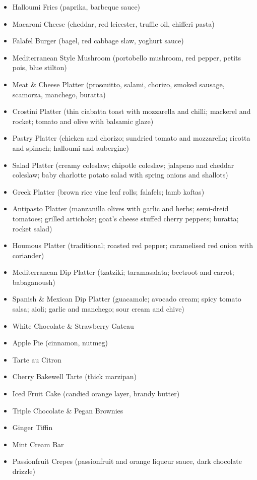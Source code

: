 \documentclass[11pt, english]{article}
\begin{document}
\begin{itemize}
		\item Halloumi Fries (paprika, barbeque sauce)
		\item Macaroni Cheese (cheddar, red leicester, truffle oil, chifferi pasta)
		\item Falafel Burger (bagel, red cabbage slaw, yoghurt sauce)
		\item Mediterranean Style Mushroom (portobello mushroom, red pepper, petits pois, blue stilton)
		\item Meat \& Cheese Platter (proscuitto, salami, chorizo, smoked sausage, scamorza, manchego, buratta)
		\item Crostini Platter (thin ciabatta toast with mozzarella and chilli; mackerel and rocket; tomato and olive with balsamic glaze)
		\item Pastry Platter (chicken and chorizo; sundried tomato and mozzarella; ricotta and spinach; halloumi and aubergine)
		\item Salad Platter (creamy coleslaw; chipotle coleslaw; jalapeno and cheddar coleslaw; baby charlotte potato salad with spring onions and shallots)
		\item Greek Platter (brown rice vine leaf rolls; falafels; lamb koftas)
		\item Antipasto Platter (manzanilla olives with garlic and herbs; semi-dreid tomatoes; grilled artichoke; goat's cheese stuffed cherry peppers; buratta; rocket salad)
		\item Houmous Platter (traditional; roasted red pepper; caramelised red onion with coriander)
		\item Mediterranean Dip Platter (tzatziki; taramasalata; beetroot and carrot; babaganoush)
		\item Spanish \& Mexican Dip Platter (guacamole; avocado cream; spicy tomato salsa; aioli; garlic and manchego; sour cream and chive)
		\item White Chocolate \& Strawberry Gateau
		\item Apple Pie (cinnamon, nutmeg)
		\item Tarte au Citron
		\item Cherry Bakewell Tarte (thick marzipan)
		\item Iced Fruit Cake (candied orange layer, brandy butter)
		\item Triple Chocolate \& Pegan Brownies
		\item Ginger Tiffin
		\item Mint Cream Bar
		\item Passionfruit Crepes (passionfruit and orange liqueur sauce, dark chocolate drizzle)

\end{itemize}
\end{document}
